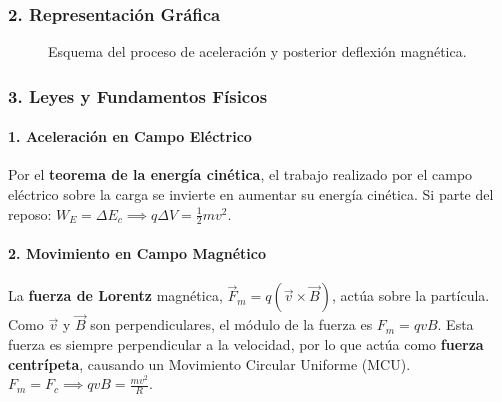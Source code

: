 \subsubsection*{2. Representación Gráfica}
\begin{figure}[H]
    \centering
    \caption{Esquema del proceso de aceleración y posterior deflexión magnética.}
\end{figure}

\subsubsection*{3. Leyes y Fundamentos Físicos}
\paragraph*{1. Aceleración en Campo Eléctrico}
Por el \textbf{teorema de la energía cinética}, el trabajo realizado por el campo eléctrico sobre la carga se invierte en aumentar su energía cinética. Si parte del reposo: $W_E = \Delta E_c \implies q \Delta V = \frac{1}{2} m v^2$.

\paragraph*{2. Movimiento en Campo Magnético}
La \textbf{fuerza de Lorentz} magnética, $\vec{F}_m = q(\vec{v} \times \vec{B})$, actúa sobre la partícula. Como $\vec{v}$ y $\vec{B}$ son perpendiculares, el módulo de la fuerza es $F_m = qvB$. Esta fuerza es siempre perpendicular a la velocidad, por lo que actúa como \textbf{fuerza centrípeta}, causando un Movimiento Circular Uniforme (MCU). $F_m = F_c \implies qvB = \frac{mv^2}{R}$.

